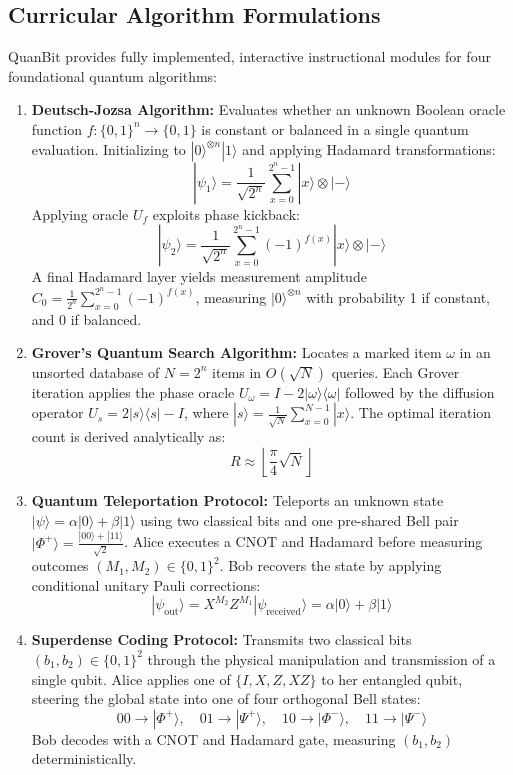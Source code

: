 \documentclass[11pt, a4paper]{article}
\begin{document}
\subsection{Curricular Algorithm Formulations}
QuanBit provides fully implemented, interactive instructional modules for four foundational quantum algorithms:
\begin{enumerate}[label=\textbf{\arabic*.}]
	\item \textbf{Deutsch-Jozsa Algorithm:} Evaluates whether an unknown Boolean oracle function $f: \{0,1\}^n \to \{0,1\}$ is constant or balanced in a single quantum evaluation. Initializing to $|0\rangle^{\otimes n}|1\rangle$ and applying Hadamard transformations:
	$$|\psi_1\rangle = \frac{1}{\sqrt{2^n}}\sum_{x=0}^{2^n-1}|x\rangle \otimes |-\rangle$$
	Applying oracle $U_f$ exploits phase kickback:
	$$|\psi_2\rangle = \frac{1}{\sqrt{2^n}}\sum_{x=0}^{2^n-1}(-1)^{f(x)}|x\rangle \otimes |-\rangle$$
	A final Hadamard layer yields measurement amplitude $C_0 = \frac{1}{2^n}\sum_{x=0}^{2^n-1}(-1)^{f(x)}$, measuring $|0\rangle^{\otimes n}$ with probability 1 if constant, and 0 if balanced.

	\item \textbf{Grover's Quantum Search Algorithm:} Locates a marked item $\omega$ in an unsorted database of $N=2^n$ items in $O(\sqrt{N})$ queries. Each Grover iteration applies the phase oracle $U_\omega = I - 2|\omega\rangle\langle\omega|$ followed by the diffusion operator $U_s = 2|s\rangle\langle s| - I$, where $|s\rangle = \frac{1}{\sqrt{N}}\sum_{x=0}^{N-1}|x\rangle$. The optimal iteration count is derived analytically as:
	$$R \approx \left\lfloor \frac{\pi}{4}\sqrt{N} \right\rfloor$$

	\item \textbf{Quantum Teleportation Protocol:} Teleports an unknown state $|\psi\rangle = \alpha|0\rangle + \beta|1\rangle$ using two classical bits and one pre-shared Bell pair $|\Phi^+\rangle = \frac{|00\rangle+|11\rangle}{\sqrt{2}}$. Alice executes a CNOT and Hadamard before measuring outcomes $(M_1, M_2) \in \{0,1\}^2$. Bob recovers the state by applying conditional unitary Pauli corrections:
	$$|\psi_{\text{out}}\rangle = X^{M_2} Z^{M_1} |\psi_{\text{received}}\rangle = \alpha|0\rangle + \beta|1\rangle$$

	\item \textbf{Superdense Coding Protocol:} Transmits two classical bits $(b_1, b_2) \in \{0,1\}^2$ through the physical manipulation and transmission of a single qubit. Alice applies one of $\{I, X, Z, XZ\}$ to her entangled qubit, steering the global state into one of four orthogonal Bell states:
	$$00 \to |\Phi^+\rangle, \quad 01 \to |\Psi^+\rangle, \quad 10 \to |\Phi^-\rangle, \quad 11 \to |\Psi^-\rangle$$
	Bob decodes with a CNOT and Hadamard gate, measuring $(b_1, b_2)$ deterministically.
\end{enumerate}
\end{document}
